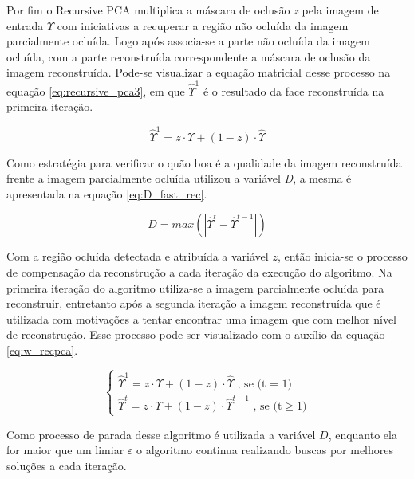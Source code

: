 Por fim o Recursive PCA multiplica a máscara de oclusão  \textit{z} pela imagem de entrada $\Upsilon$ com iniciativas a recuperar a região não ocluída da imagem parcialmente ocluída. Logo após associa-se a parte não ocluída da imagem ocluída, com a parte reconstruída correspondente a máscara de oclusão da imagem reconstruída. Pode-se visualizar a equação matricial desse processo na equação \ref{eq:recursive_pca3}, em que  $\hat{\Upsilon}^1 $ é o resultado da face reconstruída na primeira iteração.

\begin{equation}
\label{eq:recursive_pca3}
\hat{\Upsilon}^1  = z \cdot \Upsilon + (1- z) \cdot \hat{\Upsilon}
\end{equation}

Como estratégia para verificar o quão boa é a qualidade da imagem reconstruída frente a imagem parcialmente ocluída utilizou a variável \textit{D}, a mesma é apresentada na equação \ref{eq:D_fast_rec}.

\begin{equation}
\label{eq:D_fast_rec}
D = max(\left | \hat{\Upsilon}^t  - \hat{\Upsilon}^{t-1} \right |) 
\end{equation}

Com a região ocluída detectada e atribuída a variável $z$, então inicia-se o processo de compensação da reconstrução a cada iteração da execução do algoritmo. Na primeira iteração do algoritmo utiliza-se a imagem parcialmente ocluída para reconstruir, entretanto após a segunda iteração a imagem reconstruída que é utilizada com motivações a tentar encontrar uma imagem que com melhor nível de reconstrução. Esse processo pode ser visualizado com o auxílio da equação \ref{eq:w_recpca}.

\begin{equation}
\label{eq:w_recpca}
\left\{\begin{matrix}
\hat{\Upsilon}^1  = z \cdot \Upsilon + (1- z) \cdot \hat{\Upsilon}   \mbox{ , se (t = 1)}\\ 
\hat{\Upsilon}^t  = z \cdot \Upsilon + (1- z) \cdot \hat{\Upsilon}^{t-1}    \mbox{ , se (t} \geq 1)
\end{matrix}\right.
\end{equation}

Como processo de parada desse algoritmo é utilizada a variável $D$, enquanto ela for maior que um limiar $ \varepsilon$ o algoritmo continua realizando buscas por melhores soluções a cada iteração.

 
